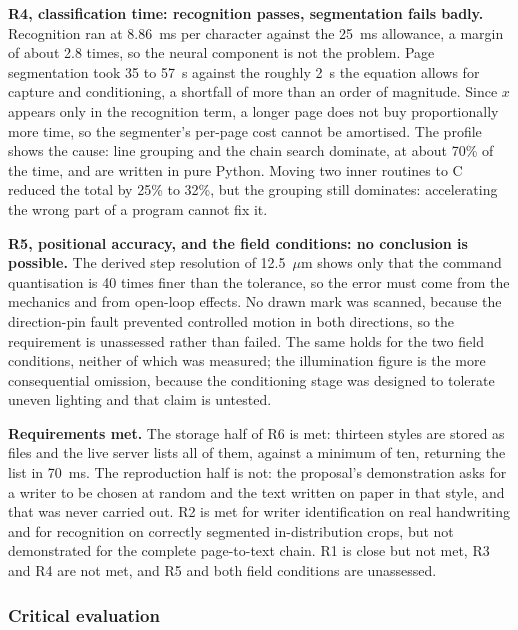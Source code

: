         \textbf{R4, classification time: recognition passes, segmentation fails badly.}
        Recognition ran at 8.86~ms per character against the 25~ms allowance, a margin of about 2.8 times, so the neural component is not the problem.
        Page segmentation took 35 to 57~s against the roughly 2~s the equation allows for capture and conditioning, a shortfall of more than an order of magnitude.
        Since $x$ appears only in the recognition term, a longer page does not buy proportionally more time, so the segmenter's per-page cost cannot be amortised.
        The profile shows the cause: line grouping and the chain search dominate, at about 70\% of the time, and are written in pure Python.
        Moving two inner routines to C reduced the total by 25\% to 32\%, but the grouping still dominates: accelerating the wrong part of a program cannot fix it.

        \textbf{R5, positional accuracy, and the field conditions: no conclusion is possible.}
        The derived step resolution of 12.5~$\mu$m shows only that the command quantisation is 40 times finer than the tolerance, so the error must come from the mechanics and from open-loop effects.
        No drawn mark was scanned, because the direction-pin fault prevented controlled motion in both directions, so the requirement is unassessed rather than failed.
        The same holds for the two field conditions, neither of which was measured; the illumination figure is the more consequential omission, because the conditioning stage was designed to tolerate uneven lighting and that claim is untested.

        \textbf{Requirements met.}
        The storage half of R6 is met: thirteen styles are stored as files and the live server lists all of them, against a minimum of ten, returning the list in 70~ms. The reproduction half is not: the proposal's demonstration asks for a writer to be chosen at random and the text written on paper in that style, and that was never carried out.
        R2 is met for writer identification on real handwriting and for recognition on correctly segmented in-distribution crops, but not demonstrated for the complete page-to-text chain.
        R1 is close but not met, R3 and R4 are not met, and R5 and both field conditions are unassessed.


    \subsubsection{Critical evaluation}
    \label{sec:dis-crit}

